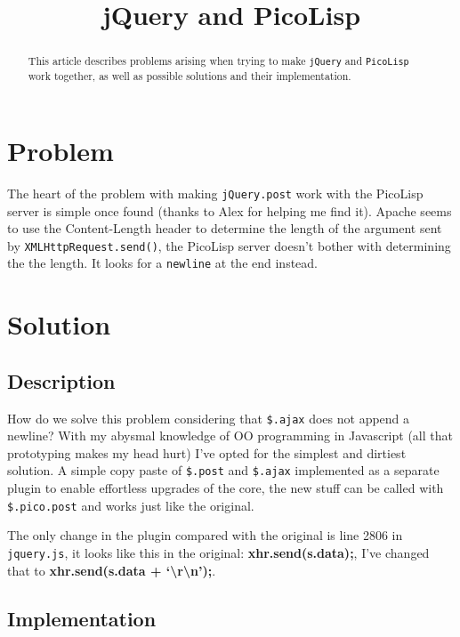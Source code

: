 \title{jQuery and PicoLisp}

\maketitle

\begin{abstract}
  This article describes problems arising when trying to make
  \texttt{jQuery} and \texttt{PicoLisp} work together, as well as
  possible solutions and their implementation. 
\end{abstract}

\section{Problem}
\label{sec:jquery-picolisp}

The heart of the problem with making \texttt{jQuery.post} work with
the PicoLisp server is simple once found (thanks to Alex for helping
me find it). Apache seems to use the Content-Length header to
determine the length of the argument sent by
\texttt{XMLHttpRequest.send()}, the PicoLisp server doesn't bother with
determining the the length. It looks for a \texttt{newline} at the end instead.

\section{Solution}
\label{sec:dsf}

\subsection{Description}
\label{sec:ds}

How do we solve this problem considering that \texttt{\$.ajax} does
not append a newline? With my abysmal knowledge of OO programming in
Javascript (all that prototyping makes my head hurt) I've opted for
the simplest and dirtiest solution. A simple copy paste of
\texttt{\$.post} and \texttt{\$.ajax} implemented as a separate plugin
to enable effortless upgrades of the core, the new stuff can be called
with \texttt{\$.pico.post} and works just like the original.

The only change in the plugin compared with the original is line 2806
in \texttt{jquery.js}, it looks like this in the original:
\textbf{xhr.send(s.data);}, I've changed that to
\textbf{xhr.send(s.data + `\textbackslash{}r\textbackslash{}n');}.

\subsection{Implementation}
\label{sec:dfs}

